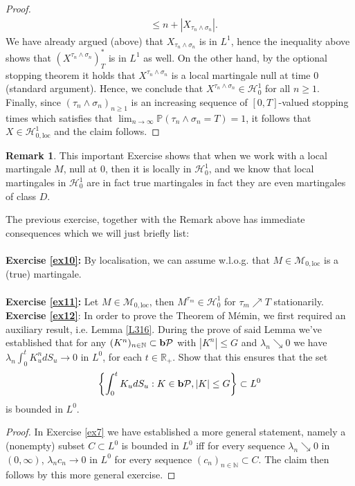 \documentclass[12pt,a4paper, twoside]{article}
\theoremstyle{definition}
\newtheorem{rem}{Remark}[section]
\newcommand{\PP}{\mathbb{P}} %
\newcommand{\pred}{\textbf{\text{b}}\mathcal{P}}
\begin{document}
\begin{proof}
\begin{align*}
& \leq n + |X_{ \tau_n \wedge \sigma_n}|.
\end{align*}
We have already argued (above) that $X_{\tau_n \wedge \sigma_n}$ is in $L^1$, hence the inequality above shows that $(X^{\tau_n \wedge \sigma_n})_T^*$ is in $L^1$ as well. On the other hand, by the optional stopping theorem it holds that $X^{\tau_n \wedge \sigma_n}$ is a local martingale null at time $0$ (standard argument). Hence, we conclude that $X^{\tau_n \wedge \sigma_n} \in \mathcal{H}_0^1$ for all $n \geq 1$. Finally,  since $( \tau_n \wedge \sigma_n)_{n \geq 1}$ is an increasing sequence of $[0,T]$-valued stopping times which satisfies that $\lim_{n \to \infty} \PP ( \tau_n \wedge \sigma_n=T)=1$, it follows that $X \in \mathcal{H}_{0, \text{loc}}^1$ and the claim follows. 
\end{proof}
\begin{rem} This important Exercise shows that when we work with a local martingale $M$, null at $0$, then it is locally in $\mathcal{H}_0^1$, and we know that local martingales in $\mathcal{H}_0^1$ are in fact true martingales in fact they are even martingales of class $D$.
\end{rem}
The previous exercise, together with the Remark above has immediate consequences which we will just briefly list:
\\\\
\textbf{Exercise \ref{ex10}:} By localisation,  we can assume w.l.o.g. that $M \in \mathcal{M}_{0, \text{loc}}$ is a (true) martingale. \\
\\
\textbf{Exercise \ref{ex11}:} Let $M \in \mathcal{M}_{0, \text{loc}}$, then $M^{\tau_m} \in \mathcal{H}_0^1$ for $\tau_m \nearrow T$ stationarily. 
\newpage
\noindent \textbf{Exercise \ref{ex12}}: In order to prove the Theorem of Mémin, we first required an auxiliary result, i.e. Lemma \ref{L316}. During the prove of said Lemma we've established that for any $(K^n)_{n \in \mathbb{N}} \subset \pred $ with $|K^n| \leq G$ and $\lambda_n \searrow 0$ we have $\lambda_n \int_0^t K_u^n dS_u \to 0$ in $L^0$, for each $t \in \mathbb{R}_+$. Show that this ensures that the set
\begin{align*}
\left\{ \int_0^t K_u dS_u : K \in \pred, |K| \leq G \right\} \subset L^0
\end{align*}
is bounded in $L^0$.
\begin{proof}
In Exercise \ref{ex7} we have established a more general statement, namely a (nonempty) subset $C \subset L^0$ is bounded in $L^0$ iff for every sequence $\lambda_n \searrow 0$ in $(0, \infty)$, $\lambda_n c_n \to 0$ in $L^0$ for every sequence $(c_n)_{n \in \mathbb{N}} \subset C.$ The claim then follows by this more general exercise.
\end{proof}
\end{document}
